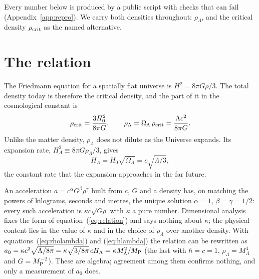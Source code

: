 \documentclass[fleqn,usenatbib]{mnras}
\begin{document}
Every number below is produced by a public script with checks that can fail (Appendix~\ref{app:repro}). We carry both densities throughout: $\rho_\Lambda$, and the critical density $\rho_{\rm crit}$ as the named alternative.

\section{The relation}
\label{sec:relation}
The Friedmann equation for a spatially flat universe is $H^2=8\pi G\rho/3$. The total density today is therefore the critical density, and the part of it in the cosmological constant is
\begin{equation}
\rho_{\rm crit}=\frac{3H_0^2}{8\pi G},\qquad
\rho_\Lambda=\Omega_\Lambda\,\rho_{\rm crit}=\frac{\Lambda c^2}{8\pi G}.
\label{eq:rholambda}
\end{equation}
Unlike the matter density, $\rho_\Lambda$ does not dilute as the Universe expands. Its expansion rate, $H_\Lambda^2\equiv8\pi G\rho_\Lambda/3$, gives
\begin{equation}
H_\Lambda=H_0\sqrt{\Omega_\Lambda}=c\sqrt{\Lambda/3},
\label{eq:hlambda}
\end{equation}
the constant rate that the expansion approaches in the far future.

An acceleration $a=c^{\alpha}G^{\beta}\rho^{\gamma}$ built from $c$, $G$ and a density has, on matching the powers of kilograms, seconds and metres, the unique solution $\alpha=1$, $\beta=\gamma=1/2$: every such acceleration is $\kappa c\sqrt{G\rho}$ with $\kappa$ a pure number. Dimensional analysis fixes the form of equation~(\ref{eq:relation}) and says nothing about $\kappa$; the physical content lies in the value of $\kappa$ and in the choice of $\rho_\Lambda$ over another density. With equations~(\ref{eq:rholambda}) and (\ref{eq:hlambda}) the relation can be rewritten as $a_0=\kappa c^2\sqrt{\Lambda/8\pi}=\kappa\sqrt{3/8\pi}\,cH_\Lambda=\kappa M_\Lambda^2/M_{\rm P}$ (the last with $\hbar=c=1$, $\rho_\Lambda=M_\Lambda^4$ and $G=M_{\rm P}^{-2}$). These are algebra; agreement among them confirms nothing, and only a measurement of $a_0$ does.
\end{document}
